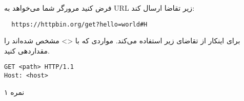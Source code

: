 
فرض کنید مرورگر شما می‌خواهد به URL زیر تقاضا ارسال کند:

\begin{latin}
\begin{verbatim}
  https://httpbin.org/get?hello=world#H
\end{verbatim}
\end{latin}

برای اینکار از تقاضای زیر استفاده می‌کند. مواردی که با <> مشخص شده‌اند را مقداردهی کنید.

\begin{latin}
\begin{verbatim}
GET <path> HTTP/1.1
Host: <host>
\end{verbatim}
\end{latin}

۱ نمره
